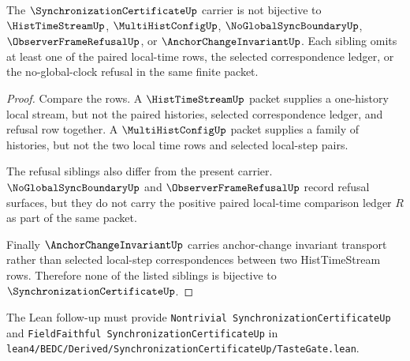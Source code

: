 \begin{theorem}
\label{thm:synchronization-certificate-sibling-independence}
The $\SynchronizationCertificateUp$ carrier is not bijective to $\HistTimeStreamUp$, $\MultiHistConfigUp$, $\NoGlobalSyncBoundaryUp$, $\ObserverFrameRefusalUp$, or $\AnchorChangeInvariantUp$. Each sibling omits at least one of the paired local-time rows, the selected correspondence ledger, or the no-global-clock refusal in the same finite packet.
\end{theorem}
\begin{proof}
Compare the rows. A $\HistTimeStreamUp$ packet supplies a one-history local stream, but not the paired histories, selected correspondence ledger, and refusal row together. A $\MultiHistConfigUp$ packet supplies a family of histories, but not the two local time rows and selected local-step pairs.

The refusal siblings also differ from the present carrier. $\NoGlobalSyncBoundaryUp$ and $\ObserverFrameRefusalUp$ record refusal surfaces, but they do not carry the positive paired local-time comparison ledger $R$ as part of the same packet.

Finally $\AnchorChangeInvariantUp$ carries anchor-change invariant transport rather than selected local-step correspondences between two HistTimeStream rows. Therefore none of the listed siblings is bijective to $\SynchronizationCertificateUp$.
\end{proof}



The Lean follow-up must provide \texttt{Nontrivial SynchronizationCertificateUp} and \texttt{FieldFaithful SynchronizationCertificateUp} in \texttt{lean4/BEDC/Derived/SynchronizationCertificateUp/TasteGate.lean}.



